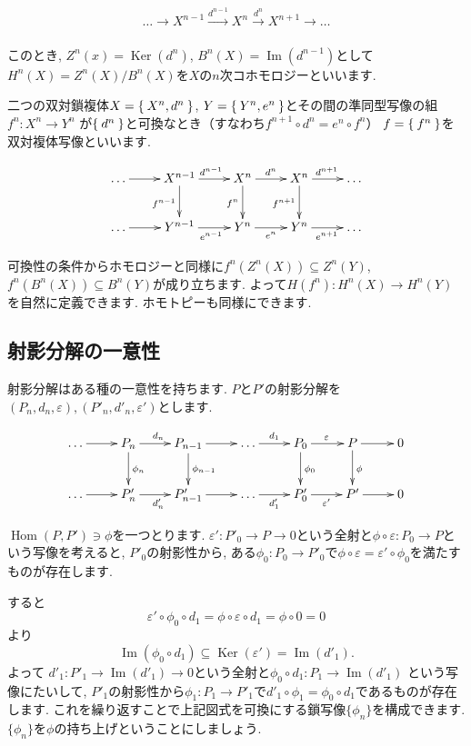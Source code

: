 \documentclass{jsarticle}
\newcommand{\makeop}[1]{\mathop{\mathrm{#1}}\nolimits}
\def\Im{\makeop{Im}}
\def\Ker{\makeop{Ker}}
\def\Hom{\makeop{Hom}}
\theoremstyle{definition}
\numberwithin{theorem}{section}
\begin{document}
\[
\ldots \rightarrow X^{n-1} \xrightarrow[]{d^{n-1}} X^{n} \xrightarrow[]{d^{n}} X^{n+1} \rightarrow \ldots
\]

このとき, $Z^n(x) = \Ker(d^n)$, $B^n(X) = \Im(d^{n-1})$として$H^n(X) = Z^n(X)/B^n(X)$を$X$の$n$次コホモロジーといいます.

二つの双対鎖複体$X = \Set{X^n, d^n}$, $Y = \Set{Y^n, e^n}$とその間の準同型写像の組$f^n:X^n \rightarrow Y^n$
が$\Set{d^n}$と可換なとき（すなわち$f^{n+1}\circ d^n=e^n\circ f^n$） $f = \Set{f^n}$を双対複体写像といいます.

\begin{equation*}
\xymatrix{
  \ldots \ar[r] & X^{n-1} \ar[r]^{d^{n-1}} \ar[d]_{f^{n-1}} & X^{n} \ar[r]^{d^n} \ar[d]_{f^{n}} & X^n \ar[r]^{d^{n+1}} \ar[d]_{f^{n+1}} & \ldots\\
  \ldots \ar[r] & Y^{n-1} \ar[r]_{e^{n-1}} & Y^{n} \ar[r]_{e^n} & Y^n \ar[r]_{e^{n+1}} & \ldots\\
}
\end{equation*}

可換性の条件からホモロジーと同様に$f^n(Z^n(X))\subseteq Z^n(Y)$, $f^n(B^n(X))\subseteq B^n(Y)$が成り立ちます.
よって$H(f^n): H^n(X) \rightarrow H^n(Y)$ を自然に定義できます.
ホモトピーも同様にできます.

\subsection{射影分解の一意性}
射影分解はある種の一意性を持ちます. $P$と$P'$の射影分解を$(P_n, d_n, \varepsilon), (P'_n, d'_n, \varepsilon')$とします.

\begin{equation*}
\xymatrix{
  \ldots \ar[r] & P_n \ar[r]^{d_n} \ar[d]^{\phi_n} & P_{n-1} \ar[r] \ar[d]^{\phi_{n-1}} & \ldots \ar[r]^{d_1} & P_0 \ar[r]^{\varepsilon} \ar[d]^{\phi_0} & P \ar[r] \ar[d]^{\phi} & 0 \\
  \ldots \ar[r] & P'_n \ar[r]_{d'_n} & P'_{n-1} \ar[r]& \ldots \ar[r]_{d'_1}& P'_0 \ar[r]_{\varepsilon'} & P' \ar[r]& 0
}
\end{equation*}

$\Hom(P, P') \ni \phi$を一つとります. $\varepsilon': P'_0 \rightarrow P \rightarrow 0$という全射と$\phi\circ\varepsilon: P_0 \rightarrow P$という写像を考えると,
$P'_0$の射影性から, ある$\phi_0: P_0 \rightarrow P'_0$で$\phi\circ\varepsilon = \varepsilon'\circ\phi_0$を満たすものが存在します.

すると
\[
\varepsilon'\circ\phi_0\circ d_1 = \phi\circ\varepsilon\circ d_1 = \phi\circ 0 = 0
\]
より
\[
\Im(\phi_0\circ d_1) \subseteq \Ker(\varepsilon') = \Im(d'_1).
\]
よって $d'_1 : P'_1 \rightarrow \Im(d'_1) \rightarrow 0$という全射と$\phi_0\circ d_1: P_1 \rightarrow \Im(d'_1)$
という写像にたいして, $P'_1$の射影性から$\phi_1: P_1 \rightarrow P'_1$で$d'_1\circ \phi_1 = \phi_0\circ d_1$であるものが存在します.
これを繰り返すことで上記図式を可換にする鎖写像$\{\phi_n\}$を構成できます. $\{\phi_n\}$を$\phi$の持ち上げということにしましょう.
\end{document}

